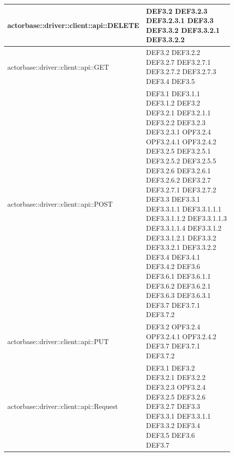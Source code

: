 \documentclass{scalatekids-article}
\begin{document}
\begin{longtable}[H]{|p{11.5cm}|p{5.5cm}|}
\hline
actorbase::driver::client::api::DELETE & \multiLineCell[t]{DEF3.2 DEF3.2.3\\DEF3.2.3.1 DEF3.3\\DEF3.3.2 DEF3.3.2.1\\DEF3.3.2.2\\}\\
\hline
actorbase::driver::client::api::GET & \multiLineCell[t]{DEF3.2 DEF3.2.2\\DEF3.2.7 DEF3.2.7.1\\DEF3.2.7.2 DEF3.2.7.3\\DEF3.4 DEF3.5\\}\\
\hline
actorbase::driver::client::api::POST & \multiLineCell[t]{DEF3.1 DEF3.1.1\\DEF3.1.2 DEF3.2\\DEF3.2.1 DEF3.2.1.1\\DEF3.2.2 DEF3.2.3\\DEF3.2.3.1 OPF3.2.4\\OPF3.2.4.1 OPF3.2.4.2\\DEF3.2.5 DEF3.2.5.1\\DEF3.2.5.2 DEF3.2.5.5\\DEF3.2.6 DEF3.2.6.1\\DEF3.2.6.2 DEF3.2.7\\DEF3.2.7.1 DEF3.2.7.2\\DEF3.3 DEF3.3.1\\DEF3.3.1.1 DEF3.3.1.1.1\\DEF3.3.1.1.2 DEF3.3.1.1.3\\DEF3.3.1.1.4 DEF3.3.1.2\\DEF3.3.1.2.1 DEF3.3.2\\DEF3.3.2.1 DEF3.3.2.2\\DEF3.4 DEF3.4.1\\DEF3.4.2 DEF3.6\\DEF3.6.1 DEF3.6.1.1\\DEF3.6.2 DEF3.6.2.1\\DEF3.6.3 DEF3.6.3.1\\DEF3.7 DEF3.7.1\\DEF3.7.2\\}\\
\hline
actorbase::driver::client::api::PUT & \multiLineCell[t]{DEF3.2 OPF3.2.4\\OPF3.2.4.1 OPF3.2.4.2\\DEF3.7 DEF3.7.1\\DEF3.7.2\\}\\
\hline
actorbase::driver::client::api::Request & \multiLineCell[t]{DEF3.1 DEF3.2\\DEF3.2.1 DEF3.2.2\\DEF3.2.3 OPF3.2.4\\DEF3.2.5 DEF3.2.6\\DEF3.2.7 DEF3.3\\DEF3.3.1 DEF3.3.1.1\\DEF3.3.2 DEF3.4\\DEF3.5 DEF3.6\\DEF3.7\\}\\

\end{longtable}
\end{document}
